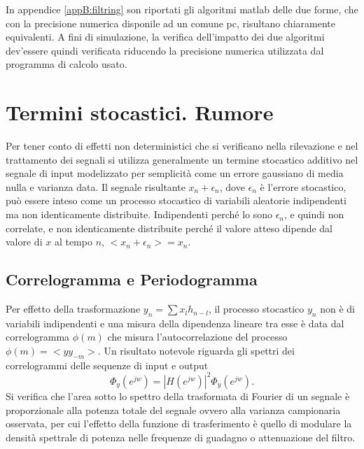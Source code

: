 In appendice \ref{appB:filtring} son riportati gli algoritmi matlab delle due forme, che con la precisione numerica disponile ad un comune pc, risultano chiaramente equivalenti. A fini di simulazione, la verifica dell'impatto dei due algoritmi dev'essere quindi verificata riducendo la precisione numerica utilizzata dal programma di calcolo usato.



\section{Termini stocastici. Rumore}

Per tener conto di effetti non deterministici che si verificano nella rilevazione e nel trattamento dei segnali si utilizza generalmente un termine stocastico additivo nel segnale di input modelizzato per semplicità come un errore gaussiano di media nulla e varianza data. Il segnale risultante
$x_{n} + \epsilon_{n}$, dove $\epsilon_{n}$ è l'errore stocastico, può essere inteso come un processo stocastico di variabili aleatorie indipendenti ma non identicamente distribuite. Indipendenti perché lo sono $\epsilon_{n}$, e quindi non correlate, e non identicamente distribuite perché il valore atteso dipende dal valore di $x$ al tempo $n$, $<x_{n} + \epsilon_{n}> = x_{n}$.


\subsection{Correlogramma e Periodogramma}
Per effetto della trasformazione $y_{n} = \sum x_{l}h_{n-l}$, il processo stocastico $y_{n}$ non è di variabili indipendenti e una misura della dipendenza lineare tra esse è data dal correlogramma $\phi(m)$ che misura l'autocorrelazione del processo $\phi(m) = <yy_{-m}>$.
Un risultato notevole riguarda gli spettri dei correlogrammi delle sequenze di input e output
\begin{equation}
 \Phi_{y}(e^{jw}) = |H(e^{jw})|^{2} \Phi_{y}(e^{jw}).
\end{equation}
Si verifica che l'area sotto lo spettro della trasformata di Fourier di un segnale è proporzionale alla potenza totale del segnale ovvero alla varianza campionaria osservata, per cui l'effetto della funzione di trasferimento è quello di modulare la densità spettrale di potenza nelle frequenze di guadagno o attenuazione del filtro.

